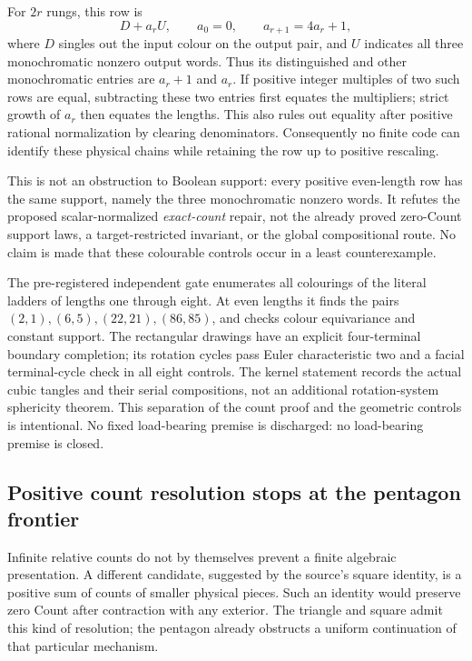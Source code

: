 For $2r$ rungs, this row is
\[
 D+a_r U,\qquad a_0=0,\qquad a_{r+1}=4a_r+1,
\]
where $D$ singles out the input colour on the output pair, and $U$
indicates all three monochromatic nonzero output words. Thus its
distinguished and other monochromatic entries are $a_r+1$ and $a_r$.
If positive integer multiples of two such rows are equal, subtracting
these two entries first equates the multipliers; strict growth of $a_r$
then equates the lengths. This also rules out equality after positive
rational normalization by clearing denominators.
Consequently no finite code can identify these physical chains while
retaining the row up to positive rescaling.

This is not an obstruction to Boolean support: every positive even-length
row has the same support, namely the three monochromatic nonzero words.
It refutes the proposed scalar-normalized \emph{exact-count} repair, not
the already proved zero-Count support laws, a target-restricted invariant,
or the global compositional route. No claim is made that these colourable
controls occur in a least counterexample.

The pre-registered independent gate enumerates all colourings of the
literal ladders of lengths one through eight. At even lengths it finds
the pairs $(2,1),(6,5),(22,21),(86,85)$, and checks colour equivariance and
constant support. The rectangular drawings have an explicit four-terminal
boundary completion; its rotation cycles pass Euler characteristic two
and a facial terminal-cycle check in all eight controls. The kernel
statement records the actual cubic tangles and their serial compositions,
not an additional rotation-system sphericity theorem. This separation of
the count proof and the geometric controls is intentional. No fixed
load-bearing premise is discharged: no load-bearing premise is closed.

\subsection{Positive count resolution stops at the pentagon frontier}
\label{sec:pentagon-positive-resolution}

Infinite relative counts do not by themselves prevent a finite algebraic
presentation. A different candidate, suggested by the source's square
identity, is a positive sum of counts of smaller physical pieces. Such an
identity would preserve zero Count after contraction with any exterior.
The triangle and square admit this kind of resolution; the pentagon
already obstructs a uniform continuation of that particular mechanism.


